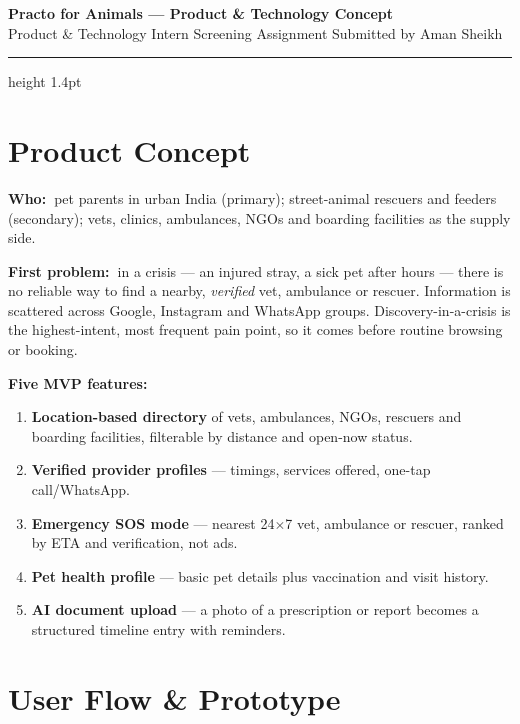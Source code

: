 \documentclass[11pt]{article}
\newcommand{\keyline}[2]{{\sffamily\bfseries\footnotesize\color{inksoft}#1\ }#2}
\begin{document}
\begin{center}
  {\sffamily\bfseries\Large\color{tealdeep} Practo for Animals --- Product \& Technology Concept}\\[2pt]
  {\sffamily\footnotesize\color{muted} Product \& Technology Intern Screening Assignment \quad\textbar\quad Submitted by Aman Sheikh}
\end{center}
\vspace{2pt}
\hrule height 1.4pt \color{coral}
\vspace{6pt}

\section{Product Concept}

\keyline{Who:}{pet parents in urban India (primary); street-animal rescuers and feeders (secondary); vets, clinics, ambulances, NGOs and boarding facilities as the supply side.}

\keyline{First problem:}{in a crisis --- an injured stray, a sick pet after hours --- there is no reliable way to find a nearby, \emph{verified} vet, ambulance or rescuer. Information is scattered across Google, Instagram and WhatsApp groups. Discovery-in-a-crisis is the highest-intent, most frequent pain point, so it comes before routine browsing or booking.}

\keyline{Five MVP features:}{}
\begin{enumerate}
  \item \textbf{Location-based directory} of vets, ambulances, NGOs, rescuers and boarding facilities, filterable by distance and open-now status.
  \item \textbf{Verified provider profiles} --- timings, services offered, one-tap call/WhatsApp.
  \item \textbf{Emergency SOS mode} --- nearest 24$\times$7 vet, ambulance or rescuer, ranked by ETA and verification, not ads.
  \item \textbf{Pet health profile} --- basic pet details plus vaccination and visit history.
  \item \textbf{AI document upload} --- a photo of a prescription or report becomes a structured timeline entry with reminders.
\end{enumerate}

\section{User Flow \& Prototype}
\end{document}

